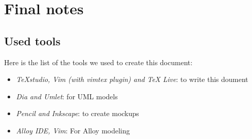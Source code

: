 \pagebreak
\section{Final notes}
\subsection{Used tools}
Here is the list of the tools we used to create this document:

\newcommand{\tool}[2]{
	\item 
		\textit{ #1}: #2	
}


\begin{itemize}
    \tool {TeXstudio, Vim (with vimtex plugin) and TeX Live}{to write this doument}
	\tool {Dia and Umlet}{for UML models}
	\tool{Pencil and Inkscape}{to create mockups}
	\tool{Alloy IDE, Vim}{For Alloy modeling}
\end{itemize}
